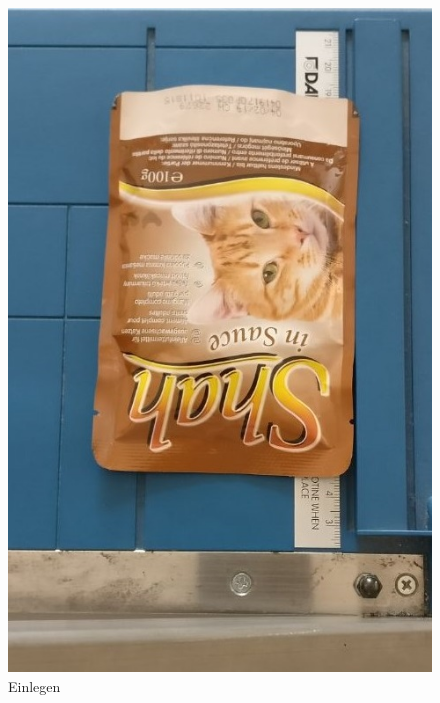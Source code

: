\begin{figure}[H]
   \begin{minipage}[hbt]{.3\linewidth} %
      \includegraphics[width=\linewidth]{Bilder/Schneideversuch_1.Art/Einlegen}
      \caption{Einlegen}
      \label{Einlegen} 
   \end{minipage}
   \hspace{.2\linewidth}%
   \begin{minipage}[hbt]{.5\linewidth} %

\end{minipage}
\end{figure}
